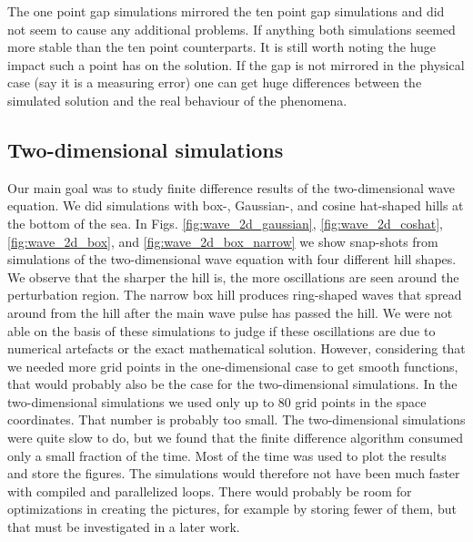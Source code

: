 \documentclass[twoside]{article}
\begin{document}
The one point gap simulations mirrored the ten point gap simulations and did not seem to cause any additional problems. If anything both simulations seemed more stable than the ten point counterparts. It is still worth noting the huge impact such a point has on the solution. If the gap is not mirrored in the physical case (say it is a measuring error) one can get huge differences between the simulated solution and the real behaviour of the phenomena. 


\subsection{Two-dimensional simulations}

Our main goal was to study finite difference results of the two-dimensional wave equation. We did simulations with box-, Gaussian-, and cosine hat-shaped hills at the bottom of the sea. In Figs. \ref{fig:wave_2d_gaussian}, \ref{fig:wave_2d_coshat}, \ref{fig:wave_2d_box}, and \ref{fig:wave_2d_box_narrow} we show snap-shots from simulations of the two-dimensional wave equation with four different hill shapes. We observe that the sharper the hill is, the more oscillations are seen around the perturbation region. The narrow box hill produces ring-shaped waves that spread around from the hill after the main wave pulse has passed the hill. We were not able on the basis of these simulations to judge if these oscillations are due to numerical artefacts or the exact mathematical solution. However, considering that we needed more grid points in the one-dimensional case to get smooth functions, that would probably also be the case for the two-dimensional simulations. In the two-dimensional simulations we used only up to 80 grid points in the space coordinates. That number is probably too small. The two-dimensional simulations were quite slow to do, but we found that the finite difference algorithm consumed only a small fraction of the time. Most of the time was used to plot the results and store the figures. The simulations would therefore not have been much faster with compiled and parallelized loops. There would probably be room for optimizations in creating the pictures, for example by storing fewer of them, but that must be investigated in a later work.  
\end{document}
